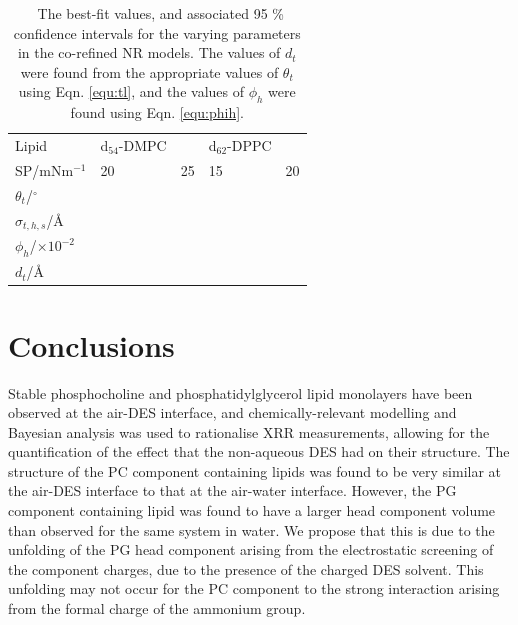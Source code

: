 \documentclass[twoside,twocolumn,9pt]{article}
\begin{document}
%
\begin{table}
	\small
	\caption{\ The best-fit values, and associated 95 \% confidence intervals for the varying parameters in the co-refined NR models. The values of $d_t$ were found from the appropriate values of $\theta_t$ using Eqn. \ref{equ:tl}, and the values of $\phi_h$ were found using Eqn. \ref{equ:phih}.}
	\label{tab:neutron}
	\begin{tabular*}{0.48\textwidth}{@{\extracolsep{\fill}}lllll}
		\hline
		Lipid & d$_{54}$-DMPC & & d$_{62}$-DPPC & \\
    SP/mNm$^{-1}$ & 20 & 25 & 15 & 20 \\
		\hline
		$\theta_t$/$^\circ$ &  &  &  &  \\
		$\sigma_{t,h,s}$/\AA &  &  &  &  \\
    \hline
    $\phi_h$/$\times10^{-2}$ &  &  &  &  \\
		$d_t$/\AA &  &  &  &  \\
		\hline
	\end{tabular*}
\end{table}
%

\section{Conclusions}
Stable phosphocholine and phosphatidylglycerol lipid monolayers have been observed at the air-DES interface, and chemically-relevant modelling and Bayesian analysis was used to rationalise XRR measurements, allowing for the quantification of the effect that the non-aqueous DES had on their structure. The structure of the PC component containing lipids was found to be very similar at the air-DES interface to that at the air-water interface. However, the PG component containing lipid was found to have a larger head component volume than observed for the same system in water. We propose that this is due to the unfolding of the PG head component arising from the electrostatic screening of the component charges, due to the presence of the charged DES solvent. This unfolding may not occur for the PC component to the strong interaction arising from the formal charge of the ammonium group.
\end{document}
